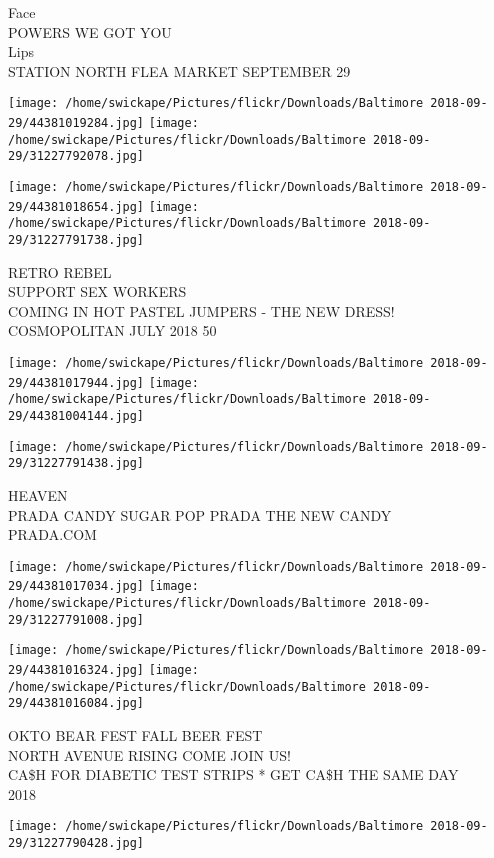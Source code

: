 \documentclass[10pt,letterpaper]{article}
\begin{document}
Face\\
POWERS WE GOT YOU\\
Lips\\
STATION NORTH FLEA MARKET SEPTEMBER 29
\pagebreak

\texttt{[image: /home/swickape/Pictures/flickr/Downloads/Baltimore 2018-09-29/44381019284.jpg]}
\texttt{[image: /home/swickape/Pictures/flickr/Downloads/Baltimore 2018-09-29/31227792078.jpg]}

\texttt{[image: /home/swickape/Pictures/flickr/Downloads/Baltimore 2018-09-29/44381018654.jpg]}
\texttt{[image: /home/swickape/Pictures/flickr/Downloads/Baltimore 2018-09-29/31227791738.jpg]}

RETRO REBEL\\
SUPPORT SEX WORKERS\\
COMING IN HOT PASTEL JUMPERS {-} THE NEW DRESS!\\
COSMOPOLITAN JULY 2018 50
\pagebreak

\texttt{[image: /home/swickape/Pictures/flickr/Downloads/Baltimore 2018-09-29/44381017944.jpg]}
\texttt{[image: /home/swickape/Pictures/flickr/Downloads/Baltimore 2018-09-29/44381004144.jpg]}

\vspace{0.25in}
\texttt{[image: /home/swickape/Pictures/flickr/Downloads/Baltimore 2018-09-29/31227791438.jpg]}

HEAVEN\\
PRADA CANDY SUGAR POP PRADA THE NEW CANDY\\
PRADA.COM
\pagebreak

\texttt{[image: /home/swickape/Pictures/flickr/Downloads/Baltimore 2018-09-29/44381017034.jpg]}
\texttt{[image: /home/swickape/Pictures/flickr/Downloads/Baltimore 2018-09-29/31227791008.jpg]}

\texttt{[image: /home/swickape/Pictures/flickr/Downloads/Baltimore 2018-09-29/44381016324.jpg]}
\texttt{[image: /home/swickape/Pictures/flickr/Downloads/Baltimore 2018-09-29/44381016084.jpg]}

OKTO BEAR FEST FALL BEER FEST\\
NORTH AVENUE RISING COME JOIN US!\\
CA\$H FOR DIABETIC TEST STRIPS * GET CA\$H THE SAME DAY\\
2018
\pagebreak

\texttt{[image: /home/swickape/Pictures/flickr/Downloads/Baltimore 2018-09-29/31227790428.jpg]}
\end{document}
